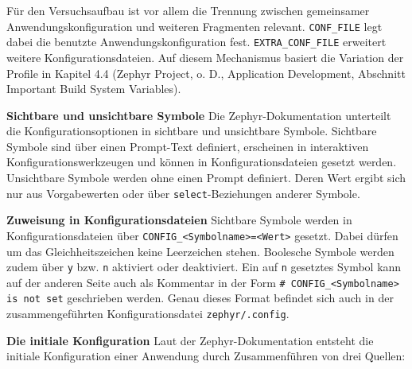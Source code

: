 F{\"u}r den Versuchsaufbau ist vor allem die Trennung zwischen gemeinsamer Anwendungskonfiguration und weiteren Fragmenten relevant. \lstinline[style=codeinline]|CONF_FILE| legt dabei die benutzte Anwendungskonfiguration fest. \lstinline[style=codeinline]|EXTRA_CONF_FILE| erweitert weitere Konfigurationsdateien. Auf diesem Mechanismus basiert die Variation der Profile in Kapitel 4.4 (Zephyr Project, o. D., \glqq{}Application Development\grqq{}, Abschnitt \glqq{}Important Build System Variables\grqq{}).

\textbf{Sichtbare und unsichtbare Symbole} Die Zephyr-Dokumentation unterteilt die Konfigurationsoptionen in \glqq{}sichtbare\grqq{} und \glqq{}unsichtbare\grqq{} Symbole. Sichtbare Symbole sind {\"u}ber einen Prompt-Text definiert, erscheinen in interaktiven Konfigurationswerkzeugen und k{\"o}nnen in Konfigurationsdateien gesetzt werden. Unsichtbare Symbole werden ohne einen Prompt definiert. Deren Wert ergibt sich nur aus Vorgabewerten oder {\"u}ber \lstinline[style=codeinline]|select|-Beziehungen anderer Symbole.

\textbf{Zuweisung in Konfigurationsdateien} Sichtbare Symbole werden in Konfigurationsdateien {\"u}ber \lstinline[style=codeinline]|CONFIG_<Symbolname>=<Wert>| gesetzt. Dabei d{\"u}rfen um das Gleichheitszeichen keine Leerzeichen stehen. Boolesche Symbole werden zudem {\"u}ber \lstinline[style=codeinline]|y| bzw. \lstinline[style=codeinline]|n| aktiviert oder deaktiviert. Ein auf \lstinline[style=codeinline]|n| gesetztes Symbol kann auf der anderen Seite auch als Kommentar in der Form \lstinline[style=codeinline]|# CONFIG_<Symbolname> is not set| geschrieben werden. Genau dieses Format befindet sich auch in der zusammengef{\"u}hrten Konfigurationsdatei \lstinline[style=codeinline]|zephyr/.config|.

\textbf{Die initiale Konfiguration} Laut der Zephyr-Dokumentation entsteht die initiale Konfiguration einer Anwendung durch Zusammenf{\"u}hren von drei Quellen:

